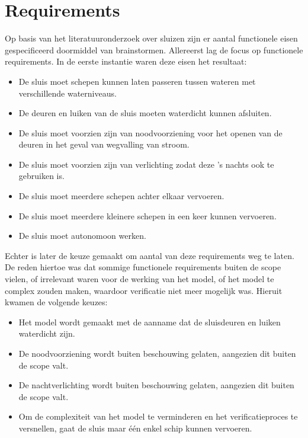 \documentclass{article} %
\begin{document}
\section{Requirements}
Op basis van het literatuuronderzoek over sluizen zijn er aantal functionele eisen gespecificeerd doormiddel van brainstormen. Allereerst lag de focus op functionele requirements. In de eerste instantie waren deze eisen het resultaat:
\begin{itemize}
    \item De sluis moet schepen kunnen laten passeren tussen wateren met verschillende waterniveaus.
    \item De deuren en luiken van de sluis moeten waterdicht kunnen afsluiten.
    \item De sluis moet voorzien zijn van noodvoorziening voor het openen van de deuren in het geval van wegvalling van stroom.
    \item De sluis moet voorzien zijn van verlichting zodat deze 's nachts ook te gebruiken is.
    \item De sluis moet meerdere schepen achter elkaar vervoeren.
    \item De sluis moet meerdere kleinere schepen in een keer kunnen vervoeren.
    \item De sluis moet autonomoon werken.
\end{itemize}

Echter is later de keuze gemaakt om aantal van deze requirements weg te laten. De reden hiertoe was dat sommige functionele requirements buiten de scope vielen, of irrelevant waren voor de werking van het model, of het model te complex zouden maken, waardoor verificatie niet meer mogelijk was. Hieruit kwamen de volgende keuzes:

\begin{itemize}
    \item Het model wordt gemaakt met de aanname dat de sluisdeuren en luiken waterdicht zijn.
    \item De noodvoorziening wordt buiten beschouwing gelaten, aangezien dit buiten de scope valt.
    \item De nachtverlichting wordt buiten beschouwing gelaten, aangezien dit buiten de scope valt.
    \item Om de complexiteit van het model te verminderen en het verificatieproces te versnellen, gaat de sluis maar één enkel schip kunnen vervoeren.
\end{itemize}
\end{document}
